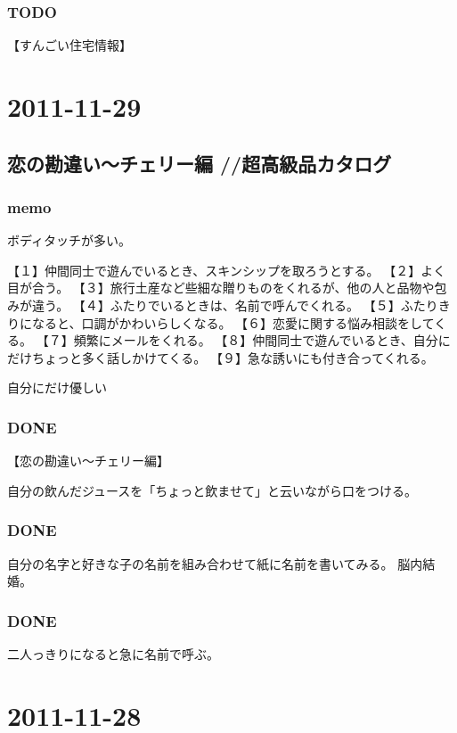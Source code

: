 \documentclass[11pt]{article}
\begin{document}
\subsubsection{\textbf{TODO}}
\label{sec-29_1_1}

【すんごい住宅情報】
\section{2011-11-29}
\label{sec-30}
\subsection{恋の勘違い～チェリー編 //超高級品カタログ}
\label{sec-30_1}
\subsubsection{memo}
\label{sec-30_1_1}

ボディタッチが多い。

【１】仲間同士で遊んでいるとき、スキンシップを取ろうとする。
【２】よく目が合う。
【３】旅行土産など些細な贈りものをくれるが、他の人と品物や包みが違う。
【４】ふたりでいるときは、名前で呼んでくれる。
【５】ふたりきりになると、口調がかわいらしくなる。
【６】恋愛に関する悩み相談をしてくる。
【７】頻繁にメールをくれる。
【８】仲間同士で遊んでいるとき、自分にだけちょっと多く話しかけてくる。
【９】急な誘いにも付き合ってくれる。

自分にだけ優しい
\subsubsection{\textbf{DONE}}
\label{sec-30_1_2}

【恋の勘違い～チェリー編】

自分の飲んだジュースを「ちょっと飲ませて」と云いながら口をつける。
\subsubsection{\textbf{DONE}}
\label{sec-30_1_3}

自分の名字と好きな子の名前を組み合わせて紙に名前を書いてみる。
脳内結婚。
\subsubsection{\textbf{DONE}}
\label{sec-30_1_4}

二人っきりになると急に名前で呼ぶ。
\section{2011-11-28}
\label{sec-31}
\end{document}
